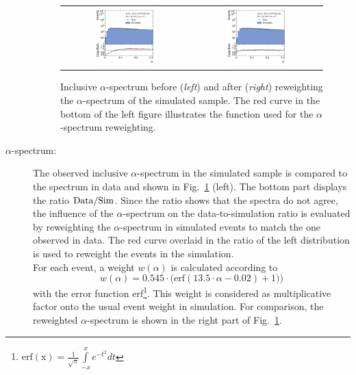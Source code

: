 \begin{description}
 \begin{figure}[!tp]
  \centering
  \begin{tabular}{cc}
                \includegraphics[width=0.49\textwidth]{figures/Alpha__AfterAsymmHistos.pdf} &
                \includegraphics[width=0.49\textwidth]{figures/AfterReweight_Alpha__AfterAsymmHistos.pdf}
  \end{tabular}
  \caption{Inclusive $\alpha$-spectrum before (\textit{left}) and after (\textit{right}) reweighting the $\alpha$-spectrum of the simulated sample. The red curve in the bottom of the left figure illustrates the function used for the $\alpha$-spectrum reweighting.}
  \label{fig:syst_uncert_alpha_spec}
\end{figure}
 
 \item[$\alpha$-spectrum:] The observed inclusive $\alpha$-spectrum in the simulated sample is compared to the spectrum in data and shown in Fig.~\ref{fig:syst_uncert_alpha_spec} (left). The bottom part displays the ratio $\rm{Data/Sim}$. Since the ratio shows that the spectra do not agree, the influence of the $\alpha$-spectrum on the data-to-simulation ratio is evaluated by reweighting the $\alpha$-spectrum in simulated events to match the one observed in data. The red curve overlaid in the ratio of the left distribution is used to reweight the events in the simulation. \\
For each event, a weight $w(\alpha)$ is calculated according to 
\begin{equation}
w(\alpha) = 0.545 \cdot \mathrm{(erf}(13.5 \cdot \alpha -0.02) +1))
\end{equation}
with the error function erf\footnote{ $\mathrm{erf(x)} = \frac{1}{\sqrt{\pi}} \int\limits_{-x}^{x} e^{-t^2} dt$}. This weight is considered as multiplicative factor onto the usual event weight in simulation. For comparison, the reweighted $\alpha$-spectrum is shown in the right part of Fig.~\ref{fig:syst_uncert_alpha_spec}.
 

\end{description}
